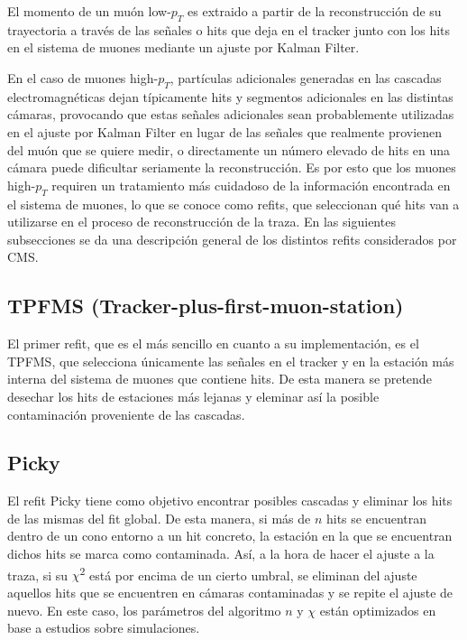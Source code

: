 
El momento de un mu\'on low-$p_{T}$ es extraido a partir de la reconstrucci\'on de su trayectoria a trav\'es de las señales o hits que deja en el tracker junto con los hits en el sistema de muones mediante un ajuste por Kalman Filter. 

En el caso de muones high-$p_{T}$, part\'iculas adicionales generadas en las cascadas electromagn\'eticas dejan t\'ipicamente hits y segmentos adicionales en las distintas c\'amaras, provocando que estas señales adicionales sean probablemente utilizadas en el ajuste por Kalman Filter en lugar de las señales que realmente provienen del mu\'on que se quiere medir, o directamente un n\'umero elevado de hits en una c\'amara puede dificultar seriamente la reconstrucci\'on. Es por esto que los muones high-$p_{T}$ requiren un tratamiento m\'as cuidadoso de la informaci\'on encontrada en el sistema de muones, lo que se conoce como refits, que seleccionan qu\'e hits van a utilizarse en el proceso de reconstrucci\'on de la traza. En las siguientes subsecciones se da una descripci\'on general de los distintos refits considerados por CMS.

\subsection{TPFMS (Tracker-plus-first-muon-station)}\label{TPFMS}

El primer refit, que es el m\'as sencillo en cuanto a su implementaci\'on, es el TPFMS, que selecciona \'unicamente las señales en el tracker y en la estaci\'on m\'as interna del sistema de muones que contiene hits. De esta manera se pretende desechar los hits de estaciones m\'as lejanas y eleminar as\'i la posible contaminaci\'on proveniente de las cascadas.

\subsection{Picky}\label{Picky}

El refit Picky tiene como objetivo encontrar posibles cascadas y eliminar los hits de las mismas del fit global. De esta manera, si m\'as de $n$ hits se encuentran dentro de un cono entorno a un hit concreto, la estaci\'on en la que se encuentran dichos hits se marca como contaminada. As\'i, a la hora de hacer el ajuste a la traza, si su $\chi$\textsuperscript{2} est\'a por encima de un cierto umbral, se eliminan del ajuste aquellos hits que se encuentren en c\'amaras contaminadas y se repite el ajuste de nuevo. En este caso, los par\'ametros del algoritmo $n$ y $\chi$ est\'an optimizados en base a estudios sobre simulaciones.

